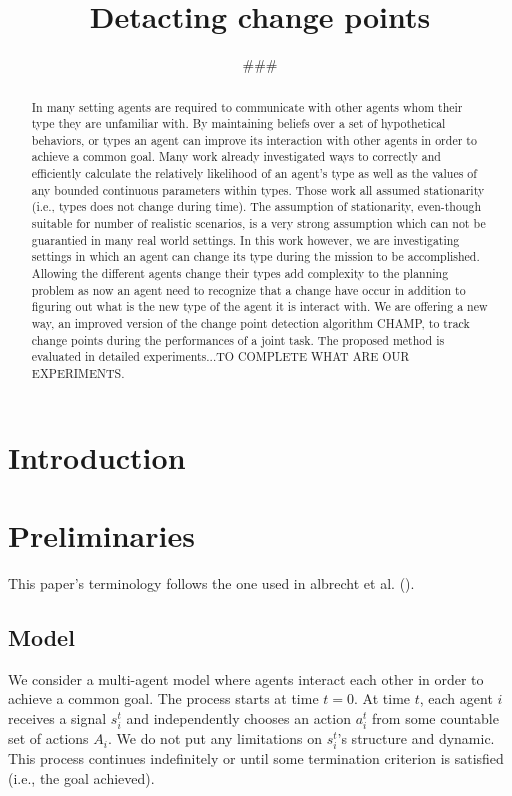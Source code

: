 \documentclass{article}
\begin{document}
\title{Detacting change points}



\author{\#\#\#}



\maketitle

\begin{abstract} 

In many setting agents are required to communicate with other agents whom their type they are unfamiliar with. By maintaining beliefs over a set of hypothetical behaviors, or types an agent can improve its interaction with other agents in order to achieve a common goal. Many work already investigated ways to correctly and efficiently calculate the relatively likelihood of an agent's type as well as the values of any bounded continuous parameters within types. Those work all assumed stationarity (i.e., types does not change during time). The assumption of stationarity, even-though suitable for number of realistic scenarios, is a very strong assumption which can not be guarantied in many real world settings. In this work however, we are investigating settings in which an agent can change its type during the mission to be accomplished. Allowing the different agents change their types add complexity to the planning problem as now an agent need to recognize that a change have occur in addition to figuring out what is the new type of the agent it is interact with. We are offering a new way,  an improved version of the change point detection algorithm CHAMP, to track change points during the performances of a joint task. The proposed method is evaluated in detailed experiments...TO COMPLETE WHAT ARE OUR EXPERIMENTS.
\end{abstract}



\section{Introduction}

\section{Preliminaries}
This paper's terminology follows the one used in albrecht et al. (\cite{albrecht2017reasoning}).

\subsection{Model}
We consider a multi-agent model where agents interact each other in order to achieve a common goal. The process starts at time $t = 0$. At time $t$, each agent $i$ receives a signal $s_i^t$ and independently chooses an action $a_i^t$ from some countable set of actions $A_i$. We do not put any limitations on $s_i^t$'s structure and dynamic. This process continues indefinitely or until some termination criterion is satisfied (i.e., the goal achieved).
\end{document}

